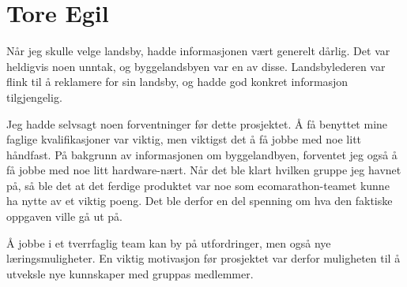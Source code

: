 \section{Tore Egil}
Når jeg skulle velge landsby, hadde informasjonen vært generelt dårlig.
Det var heldigvis noen unntak, og byggelandsbyen var en av disse.
Landsbylederen var flink til å reklamere for sin landsby, og hadde god konkret informasjon tilgjengelig. 

Jeg hadde selvsagt noen forventninger før dette prosjektet. 
Å få benyttet mine faglige kvalifikasjoner var viktig, men viktigst det å få jobbe med noe litt håndfast.
På bakgrunn av informasjonen om byggelandbyen, forventet jeg også å få jobbe med noe litt hardware-nært.
Når det ble klart hvilken gruppe jeg havnet på, så ble det at det ferdige produktet var noe som ecomarathon-teamet kunne ha nytte av et viktig poeng.
Det ble derfor en del spenning om hva den faktiske oppgaven ville gå ut på.

Å jobbe i et tverrfaglig team kan by på utfordringer, men også nye læringsmuligheter. 
En viktig motivasjon før prosjektet var derfor muligheten til å utveksle nye kunnskaper med gruppas medlemmer.


